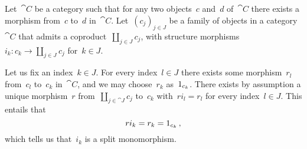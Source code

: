 \subsection{}

Let~$\cat{C}$ be a category such that for any two objects~$c$ and~$d$ of~$\cat{C}$ there exists a morphism from~$c$ to~$d$ in~$\cat{C}$.
Let~$(c_j)_{j ∈ J}$ be a family of objects in a category~$\cat{C}$ that admits a coproduct~$∐_{j ∈ J} c_j$, with structure morphisms~$i_k \colon c_k \to ∐_{j ∈ J} c_j$ for~$k ∈ J$.

Let us fix an index~$k ∈ J$.
For every index~$l ∈ J$ there exists some morphism~$r_l$ from~$c_l$ to~$c_k$ in~$\cat{C}$, and we may choose~$r_k$ as~$1_{c_k}$.
There exists by assumption a unique morphism~$r$ from~$∐_{j ∈ \cat{J}} c_j$ to~$c_k$ with~$r i_l = r_l$ for every index~$l ∈ J$.
This entails that
\[
	r i_k = r_k = 1_{c_k} \,,
\]
which tells us that~$i_k$ is a split monomorphism.
